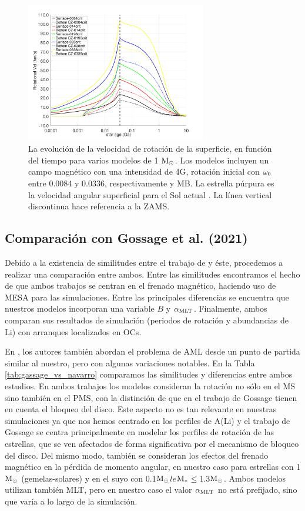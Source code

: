 \begin{figure}
	\centering
	\includegraphics[width=0.7\textwidth]{img/paper2/rot_vel_var_vel_4_0g4.pdf}
	\caption{La evolución de la velocidad de rotación de la superficie, en función del tiempo para varios modelos de 1 $\mathrm{M}_\odot$. Los modelos incluyen un campo magnético con una intensidad de 4G, rotación inicial con $\omega_{\mathrm{0}}$ entre 0.0084 y 0.0336, respectivamente y MB. La estrella púrpura es la velocidad angular superficial para el Sol actual \cite{Gill2012}. La línea vertical discontinua hace referencia a la ZAMS.}
	\label{fig:rot_vel_var_vel_4_0g4}
\end{figure}

\subsection{Comparación con Gossage et al. (2021)}
Debido a la existencia de similitudes entre el trabajo de \cite{Gossage2021} y éste, procedemos a realizar una comparación entre ambos. Entre las similitudes encontramos el hecho de que ambos trabajos se centran en el frenado magnético, haciendo uso de MESA para las simulaciones. Entre las principales diferencias se encuentra que nuestros modelos incorporan una variable $B$ y $\alpha_{\mathrm{MLT}}$. Finalmente, ambos comparan sus resultados de simulación (periodos de rotación y abundancias de Li) con arranques localizados en OCs.\par

En \cite{Gossage2021}, los autores también abordan el problema de AML desde un punto de partida similar al nuestro, pero con algunas variaciones notables. En la Tabla \ref{tab:gassage_vs_navarro} comparamos las similitudes y diferencias entre ambos estudios. En ambos trabajos los modelos consideran la rotación no sólo en el MS sino también en el PMS, con la distinción de que en el trabajo de Gossage tienen en cuenta el bloqueo del disco. Este aspecto no es tan relevante en nuestras simulaciones ya que nos hemos centrado en los perfiles de A(Li) y el trabajo de Gossage se centra principalmente en modelar los perfiles de rotación de las estrellas, que se ven afectados de forma significativa por el mecanismo de bloqueo del disco. Del mismo modo, también se consideran los efectos del frenado magnético en la pérdida de momento angular, en nuestro caso para estrellas con 1$\mathrm{M}_\odot$ (gemelas-solares) y en el suyo con 0.1$\mathrm{M}_\odot$$le$$\mathrm{M}_*$$\le$1.3$\mathrm{M}_\odot$. Ambos modelos utilizan también MLT, pero en nuestro caso el valor $\alpha_{\mathrm{MLT}}$ no está prefijado, sino que varía a lo largo de la simulación.\par

